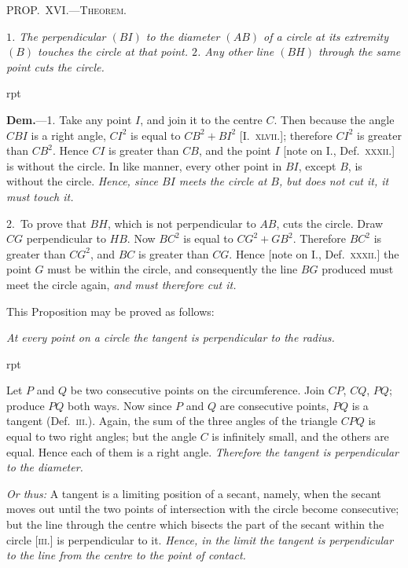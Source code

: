 \documentclass[oneside]{book}
\newcounter{wrapwidth}
\newcommand\mypropl[2]{
\bigskip\Needspace*{4\baselineskip}\begin{center}\textsc{#1}\end{center}
\hspace{\parindent}\emph{#2}\par\medskip
}
\newcommand\imgflow[3]{
\setcounter{wrapwidth}{#1}

\begin{wrapfigure}[#2]{r}{\value{wrapwidth}pt}
\begin{center}
\vspace{-0.3in}

\end{center}
\end{wrapfigure}
}
\begin{document}
\mypropl{PROP\@.~XVI\@.---Theorem.}{$1$. The perpendicular $(BI)$ to the diameter $(AB)$ of a
circle at its extremity $(B)$ touches the circle at that point.
$2$. Any other line $(BH)$ through the same point cuts the
circle.}


\imgflow{125}{10}{f121}

\textbf{Dem.}---1. Take any point $I$, and join it to the centre
$C$. Then because the angle $CBI$
is a right angle, $CI^{2}$ is equal to
$CB^{2} + BI^{2}$ [I.~\textsc{xlvii}.]; therefore
$CI^{2}$ is greater than $CB^{2}$. Hence
$CI$ is greater than $CB$, and the
point $I$ [note on I., Def.~\textsc{xxxii.}]
is without the circle. In like
manner, every other point in
$BI$, except $B$, is without the
circle. \emph{Hence, since $BI$ meets
the circle at $B$, but does not cut it, it must touch it.}

2.~To prove that $BH$, which is not perpendicular to
$AB$, cuts the circle. Draw $CG$ perpendicular to $HB$.
Now $BC^{2}$ is equal to $CG^{2} + GB^{2}$. Therefore $BC^{2}$ is
greater than $CG^{2}$, and $BC$ is greater than $CG$. Hence
[note on I., Def.~\textsc{xxxii.}] the point $G$ must be within
the circle, and consequently the line $BG$ produced
must meet the circle again, \emph{and must therefore cut it.}

This Proposition may be proved as follows:

\emph{At every point on a circle the tangent is perpendicular
to the radius.}




\imgflow{96}{7}{f122}
Let $P$ and $Q$ be two consecutive points on the circumference.
Join $CP$, $CQ$, $PQ$;
produce $PQ$ both ways. Now since
$P$ and $Q$ are consecutive points, $PQ$
is a tangent (Def.~\textsc{iii.}). Again, the
sum of the three angles of the triangle
$CPQ$ is equal to two right
angles; but the angle $C$ is infinitely
small, and the others are equal.
Hence each of them is a right angle. \textit{Therefore the
tangent is perpendicular to the diameter.}

\textit{Or thus:} A tangent is a limiting position of a secant,
namely, when the secant moves out until the two
points of intersection with the circle become consecutive;
but the line through the centre which bisects
the part of the secant within the circle [\textsc{iii.}] is perpendicular
to it. \textit{Hence, in the limit the tangent is
perpendicular to the line from the centre to the point
of contact.}
\end{document}
